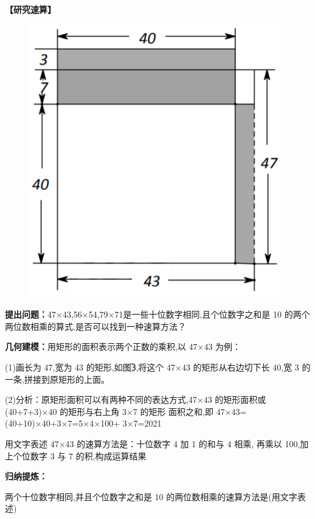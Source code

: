 \documentclass[10pt,a4paper]{ctexart}
\begin{document}
	\textbf{【研究速算】}
	
	\begin{figure}
			\includegraphics[width=\linewidth]{23/2013b}
	\end{figure}
	
	\textbf{提出问题：}47×43,56×54,79×71是一些十位数字相同,且个位数字之和是 10 的两个两位数相乘的算式,是否可以找到一种速算方法？
	
	\textbf{几何建模：}用矩形的面积表示两个正数的乘积,以 47×43 为例：
	
	(1)画长为 47,宽为 43 的矩形,如图\textcircled{3},将这个 47×43 的矩形从右边切下长 40,宽 3 的一条,拼接到原矩形的上面。
	
	(2)分析：原矩形面积可以有两种不同的表达方式,47×43
	的矩形面积或(40+7+3)×40 的矩形与右上角 3×7 的矩形
	面积之和,即 47×43=(40+10)×40+3×7=5×4×100+
	3×7=2021
	
	用文字表述 47×43 的速算方法是：十位数字 4 加 1 的和与 4 相乘,
	再乘以 100,加上个位数字 3 与 7 的积,构成运算结果
	
	\textbf{归纳提炼：}
	
	两个十位数字相同,并且个位数字之和是 10 的两位数相乘的速算方法是(用文字表述)
	
	\rule{0em}{6em}
	
\end{document}
